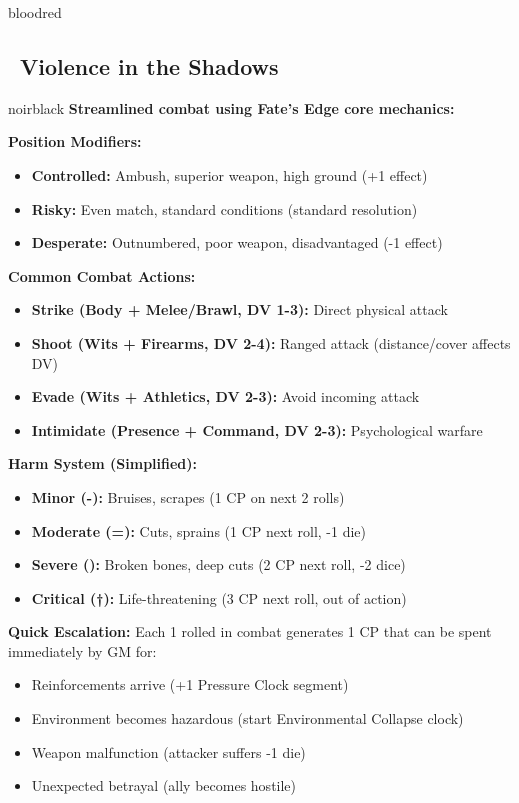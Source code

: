 \documentclass[11pt]{article}
\begin{document}
\newpage

\begin{noirsection}{bloodred}
\subsection*{\faFistRaised\ Violence in the Shadows}

\begin{mechanicbox}{noirblack}
\textbf{Streamlined combat using Fate's Edge core mechanics:}

\textbf{Position Modifiers:}
\begin{itemize}
    \item \textbf{Controlled:} Ambush, superior weapon, high ground (+1 effect)
    \item \textbf{Risky:} Even match, standard conditions (standard resolution)
    \item \textbf{Desperate:} Outnumbered, poor weapon, disadvantaged (-1 effect)
\end{itemize}

\textbf{Common Combat Actions:}
\begin{itemize}
    \item \textbf{Strike (Body + Melee/Brawl, DV 1-3):} Direct physical attack
    \item \textbf{Shoot (Wits + Firearms, DV 2-4):} Ranged attack (distance/cover affects DV)
    \item \textbf{Evade (Wits + Athletics, DV 2-3):} Avoid incoming attack
    \item \textbf{Intimidate (Presence + Command, DV 2-3):} Psychological warfare
\end{itemize}

\textbf{Harm System (Simplified):}
\begin{itemize}
    \item \textbf{Minor (-):} Bruises, scrapes (1 CP on next 2 rolls)
    \item \textbf{Moderate (=):} Cuts, sprains (1 CP next roll, -1 die)
    \item \textbf{Severe ():} Broken bones, deep cuts (2 CP next roll, -2 dice)
    \item \textbf{Critical (†):} Life-threatening (3 CP next roll, out of action)
\end{itemize}

\textbf{Quick Escalation:} Each 1 rolled in combat generates 1 CP that can be spent immediately by GM for:
\begin{itemize}
    \item Reinforcements arrive (+1 Pressure Clock segment)
    \item Environment becomes hazardous (start Environmental Collapse clock)
    \item Weapon malfunction (attacker suffers -1 die)
    \item Unexpected betrayal (ally becomes hostile)
\end{itemize}
\end{mechanicbox}
\end{noirsection}
\end{document}
